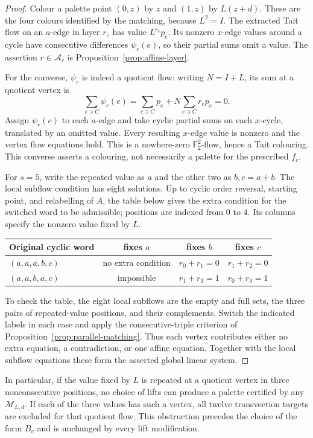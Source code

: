 \documentclass[11pt,a4paper]{article}
\theoremstyle{definition}
\theoremstyle{remark}
\begin{document}
\begin{proof}
Colour a palette point $(0,z)$ by $z$ and $(1,z)$ by $L(z+d)$.  These are the four colours identified by the matching, because $L^2=I$.  The extracted Tait flow on an $a$-edge in layer $r_e$ has value $L^{r_e}p_e$.  Its nonzero $x$-edge values around a cycle have consecutive differences $\psi_r(e)$, so their partial sums omit a value.  The assertion $r\in\mathcal A_c$ is Proposition~\ref{prop:affine-layer}.

For the converse, $\psi_r$ is indeed a quotient flow: writing $N=I+L$, its sum at a quotient vertex is
\[
 \sum_{e\ni C}\psi_r(e)
 =\sum_{e\ni C}p_e+N\sum_{e\ni C}r_ep_e=0.
\]
Assign $\psi_r(e)$ to each $a$-edge and take cyclic partial sums on each $x$-cycle, translated by an omitted value.  Every resulting $x$-edge value is nonzero and the vertex flow equations hold.  This is a nowhere-zero $\mathbb F_2^2$-flow, hence a Tait colouring.  This converse asserts a colouring, not necessarily a palette for the prescribed $f_c$.

For $s=5$, write the repeated value as $a$ and the other two as $b,c=a+b$.  The local subflow condition has eight solutions.  Up to cyclic order reversal, starting point, and relabelling of $A$, the table below gives the extra condition for the switched word to be admissible; positions are indexed from $0$ to $4$.  Its columns specify the nonzero value fixed by $L$.
\begin{center}
\begin{tabular}{@{}lccc@{}}
\toprule
Original cyclic word & fixes $a$ & fixes $b$ & fixes $c$\\
\midrule
$(a,a,a,b,c)$ & no extra condition & $r_0+r_1=0$ & $r_1+r_2=0$\\
$(a,a,b,a,c)$ & impossible & $r_1+r_3=1$ & $r_0+r_3=1$\\
\bottomrule
\end{tabular}
\end{center}
To check the table, the eight local subflows are the empty and full sets, the three pairs of repeated-value positions, and their complements.  Switch the indicated labels in each case and apply the consecutive-triple criterion of Proposition~\ref{prop:parallel-matching}.  Thus each vertex contributes either no extra equation, a contradiction, or one affine equation.  Together with the local subflow equations these form the asserted global linear system.
\end{proof}

In particular, if the value fixed by $L$ is repeated at a quotient vertex in three nonconsecutive positions, no choice of lifts can produce a palette certified by any $\mathcal M_{L,d}$.  If each of the three values has such a vertex, all twelve transvection targets are excluded for that quotient flow.  This obstruction precedes the choice of the form $B_c$ and is unchanged by every lift modification.
\end{document}

